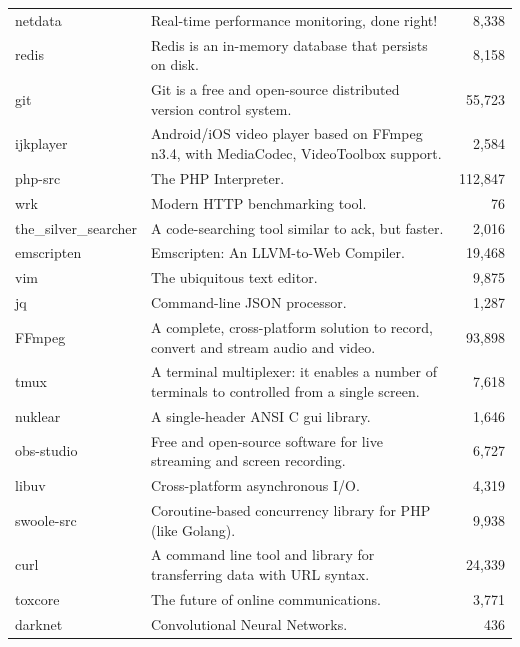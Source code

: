 \documentclass[10pt,journal,compsoc]{IEEEtran}
\begin{document}
\begin{table}[htbp]
\begin{tabular}{@{}lp{13cm}r@{}}
netdata & Real-time performance monitoring, done right! & 8,338 \\
redis & Redis is an in-memory database that persists on disk. & 8,158 \\
git & Git is a free and open-source distributed version control system. & 55,723 \\
ijkplayer & Android/iOS video player based on FFmpeg n3.4, with MediaCodec, VideoToolbox support. & 2,584 \\
php-src & The PHP Interpreter. & 112,847 \\
wrk & Modern HTTP benchmarking tool. & 76 \\
the\_silver\_searcher & A code-searching tool similar to ack, but faster. & 2,016 \\
emscripten & Emscripten: An LLVM-to-Web Compiler. & 19,468 \\
vim & The ubiquitous text editor. & 9,875 \\
jq & Command-line JSON processor. & 1,287 \\
FFmpeg & A complete, cross-platform solution to record, convert and stream audio and video. & 93,898 \\
tmux & A terminal multiplexer: it enables a number of terminals to controlled from a single screen.  & 7,618 \\
nuklear & A single-header ANSI C gui library. & 1,646 \\
obs-studio & Free and open-source software for live streaming and screen recording. & 6,727 \\
libuv & Cross-platform asynchronous I/O. & 4,319 \\
swoole-src & Coroutine-based concurrency library for PHP (like Golang). & 9,938 \\
curl & A command line tool and library for transferring data with URL syntax. & 24,339 \\
toxcore & The future of online communications. & 3,771 \\
darknet & Convolutional Neural Networks. & 436 \\
\bottomrule
\end{tabular}
\end{table}
\end{document}
